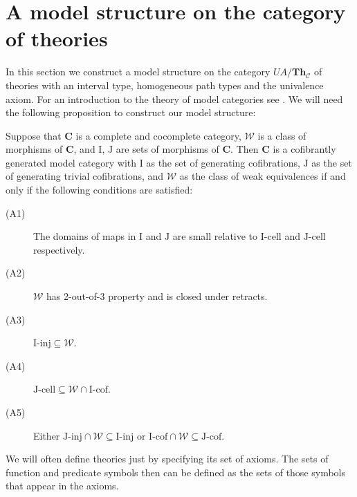 \documentclass[reqno]{amsart}
\theoremstyle{definition}
\theoremstyle{remark}
\newcommand{\cat}[1]{\mathbf{#1}}
\newcommand{\C}{\cat{C}}
\newcommand{\Th}{\cat{Th}}
\newcommand{\we}{\mathcal{W}}
\newcommand{\I}{\mathrm{I}}
\newcommand{\J}{\mathrm{J}}
\newcommand{\class}[2]{#1\text{-}\mathrm{#2}}
\newcommand{\Iinj}[1][\I]{\class{#1}{inj}}
\newcommand{\Icell}[1][\I]{\class{#1}{cell}}
\newcommand{\Icof}[1][\I]{\class{#1}{cof}}
\newcommand{\Jinj}[1][]{\Iinj[\J#1]}
\newcommand{\Jcell}[1][]{\Icell[\J#1]}
\newcommand{\Jcof}[1][]{\Icof[\J#1]}
\numberwithin{figure}{section}
\begin{document}
\section{A model structure on the category of theories}

In this section we construct a model structure on the category $UA/\Th_\mathcal{C}$ of theories with an interval type, homogeneous path types and the univalence axiom.
For an introduction to the theory of model categories see \cite{hovey}.
We will need the following proposition to construct our model structure:

\begin{prop}
Suppose that $\C$ is a complete and cocomplete category, $\we$ is a class of morphisms of $\C$, and $\I$, $\J$ are sets of morphisms of $\C$.
Then $\C$ is a cofibrantly generated model category with $\I$ as the set of generating cofibrations,
$\J$ as the set of generating trivial cofibrations, and $\we$ as the class of weak equivalences if and only if the following conditions are satisfied:
\begin{description}
\item[(A1)] The domains of maps in $\I$ and $\J$ are small relative to $\Icell$ and $\Jcell$ respectively.
\item[(A2)] $\we$ has 2-out-of-3 property and is closed under retracts.
\item[(A3)] $\Iinj \subseteq \we$.
\item[(A4)] $\Jcell \subseteq \we \cap \Icof$.
\item[(A5)] Either $\Jinj \cap \we \subseteq \Iinj$ or $\Icof \cap \we \subseteq \Jcof$.
\end{description}
\end{prop}

We will often define theories just by specifying its set of axioms.
The sets of function and predicate symbols then can be defined as the sets of those symbols that appear in the axioms.
\end{document}
